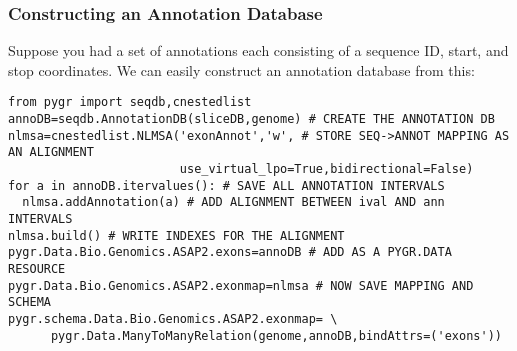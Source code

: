 \documentclass{howto}
\begin{document}
\subsubsection{Constructing an Annotation Database}
Suppose you had a set of annotations  each consisting of a sequence ID,
start, and stop coordinates.  We can easily construct an annotation database
from this:
\begin{verbatim}
from pygr import seqdb,cnestedlist
annoDB=seqdb.AnnotationDB(sliceDB,genome) # CREATE THE ANNOTATION DB
nlmsa=cnestedlist.NLMSA('exonAnnot','w', # STORE SEQ->ANNOT MAPPING AS AN ALIGNMENT
                        use_virtual_lpo=True,bidirectional=False)
for a in annoDB.itervalues(): # SAVE ALL ANNOTATION INTERVALS
  nlmsa.addAnnotation(a) # ADD ALIGNMENT BETWEEN ival AND ann INTERVALS
nlmsa.build() # WRITE INDEXES FOR THE ALIGNMENT
pygr.Data.Bio.Genomics.ASAP2.exons=annoDB # ADD AS A PYGR.DATA RESOURCE
pygr.Data.Bio.Genomics.ASAP2.exonmap=nlmsa # NOW SAVE MAPPING AND SCHEMA
pygr.schema.Data.Bio.Genomics.ASAP2.exonmap= \
      pygr.Data.ManyToManyRelation(genome,annoDB,bindAttrs=('exons'))
\end{verbatim}
\end{document}
